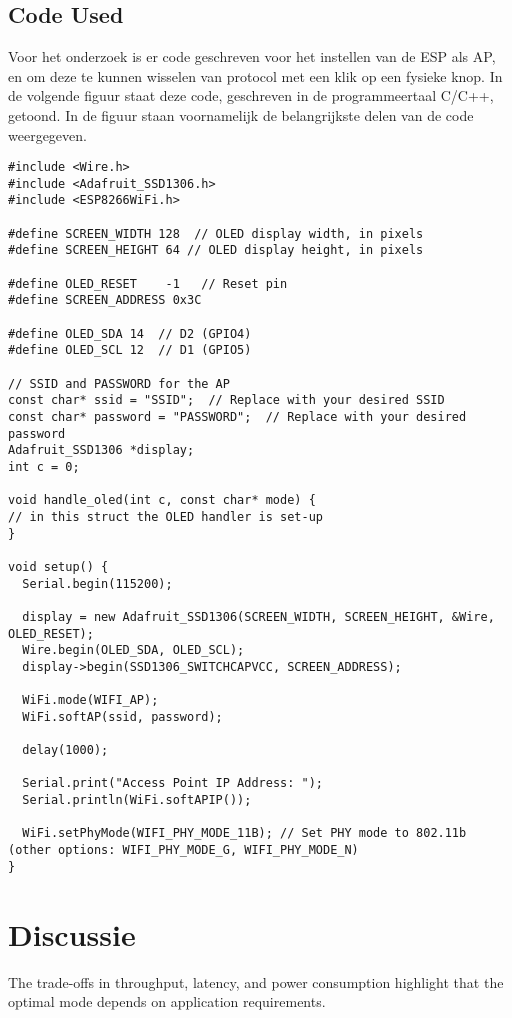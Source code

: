 \documentclass[conference]{IEEEtran}
\begin{document}
\subsection{Code Used}
Voor het onderzoek is er code geschreven voor het instellen van de ESP als AP, en om deze te kunnen wisselen van protocol met een klik op een fysieke knop. In de volgende figuur staat deze code, geschreven in de programmeertaal C/C++, getoond. In de figuur staan voornamelijk de belangrijkste delen van de code weergegeven.
\newpage
\begin{lstlisting}[style=CStyle]
#include <Wire.h>
#include <Adafruit_SSD1306.h>
#include <ESP8266WiFi.h>

#define SCREEN_WIDTH 128  // OLED display width, in pixels
#define SCREEN_HEIGHT 64 // OLED display height, in pixels

#define OLED_RESET    -1   // Reset pin 
#define SCREEN_ADDRESS 0x3C

#define OLED_SDA 14  // D2 (GPIO4)
#define OLED_SCL 12  // D1 (GPIO5)

// SSID and PASSWORD for the AP
const char* ssid = "SSID";  // Replace with your desired SSID
const char* password = "PASSWORD";  // Replace with your desired password
Adafruit_SSD1306 *display;
int c = 0;

void handle_oled(int c, const char* mode) {
// in this struct the OLED handler is set-up
}

void setup() {
  Serial.begin(115200);
  
  display = new Adafruit_SSD1306(SCREEN_WIDTH, SCREEN_HEIGHT, &Wire, OLED_RESET);
  Wire.begin(OLED_SDA, OLED_SCL);
  display->begin(SSD1306_SWITCHCAPVCC, SCREEN_ADDRESS);

  WiFi.mode(WIFI_AP);
  WiFi.softAP(ssid, password);

  delay(1000);

  Serial.print("Access Point IP Address: ");
  Serial.println(WiFi.softAPIP());

  WiFi.setPhyMode(WIFI_PHY_MODE_11B); // Set PHY mode to 802.11b (other options: WIFI_PHY_MODE_G, WIFI_PHY_MODE_N)
}
\end{lstlisting}

\section{Discussie}
The trade-offs in throughput, latency, and power consumption highlight that the optimal mode depends on application requirements. \lipsum[10-12]
\end{document}
